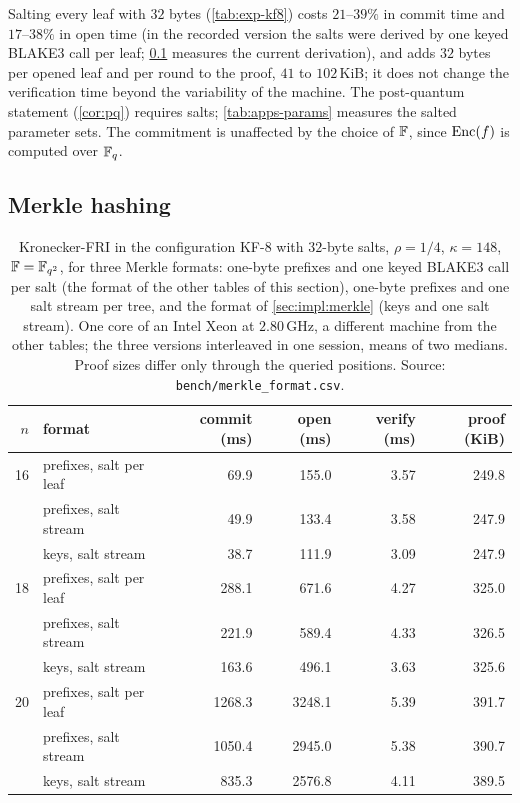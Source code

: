 Salting every leaf with $32$ bytes (\cref{tab:exp-kf8}) costs $21$--$39\%$ in commit time and $17$--$38\%$ in open time (in the recorded version the salts were derived by one keyed BLAKE3 call per leaf; \cref{sec:exp:hash} measures the current derivation), and adds $32$ bytes per opened leaf and per round to the proof, $41$ to $102$\,KiB; it does not change the verification time beyond the variability of the machine.
The post-quantum statement (\cref{cor:pq}) requires salts; \cref{tab:apps-params} measures the salted parameter sets.
The commitment is unaffected by the choice of $\mathbb{F}$, since $\mathrm{Enc}(f)$ is computed over $\mathbb{F}_q$.

\subsection{Merkle hashing}\label{sec:exp:hash}

\begin{table}[t]
\centering
\small
\begin{tabular}{r l rrrr}
\toprule
$n$ & format & commit (ms) & open (ms) & verify (ms) & proof (KiB) \\
\midrule
16 & prefixes, salt per leaf & 69.9 & 155.0 & 3.57 & 249.8 \\
   & prefixes, salt stream & 49.9 & 133.4 & 3.58 & 247.9 \\
   & keys, salt stream & 38.7 & 111.9 & 3.09 & 247.9 \\
\midrule
18 & prefixes, salt per leaf & 288.1 & 671.6 & 4.27 & 325.0 \\
   & prefixes, salt stream & 221.9 & 589.4 & 4.33 & 326.5 \\
   & keys, salt stream & 163.6 & 496.1 & 3.63 & 325.6 \\
\midrule
20 & prefixes, salt per leaf & 1268.3 & 3248.1 & 5.39 & 391.7 \\
   & prefixes, salt stream & 1050.4 & 2945.0 & 5.38 & 390.7 \\
   & keys, salt stream & 835.3 & 2576.8 & 4.11 & 389.5 \\
\bottomrule
\end{tabular}
\caption{Kronecker-FRI in the configuration KF-8 with $32$-byte salts, $\rho = 1/4$, $\kappa = 148$, $\mathbb{F} = \mathbb{F}_{q^2}$, for three Merkle formats: one-byte prefixes and one keyed BLAKE3 call per salt (the format of the other tables of this section), one-byte prefixes and one salt stream per tree, and the format of \cref{sec:impl:merkle} (keys and one salt stream). One core of an Intel Xeon at $2.80$\,GHz, a different machine from the other tables; the three versions interleaved in one session, means of two medians. Proof sizes differ only through the queried positions. Source: \texttt{bench/merkle\_format.csv}.}
\label{tab:exp-hash}
\end{table}


